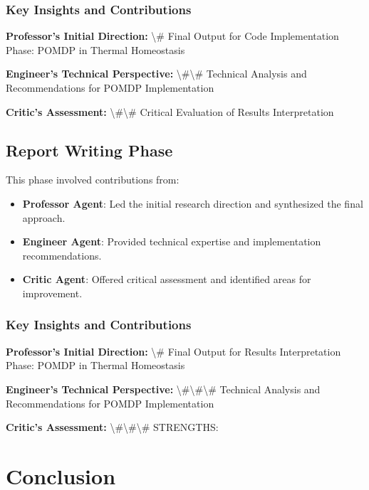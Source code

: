 \documentclass[11pt,a4paper]{article}
\begin{document}
\subsubsection{Key Insights and Contributions}


\textbf{Professor's Initial Direction:} \textbackslash{}# Final Output for Code Implementation Phase: POMDP in Thermal Homeostasis


\textbf{Engineer's Technical Perspective:} \textbackslash{}#\textbackslash{}# Technical Analysis and Recommendations for POMDP Implementation


\textbf{Critic's Assessment:} \textbackslash{}#\textbackslash{}# Critical Evaluation of Results Interpretation


\subsection{Report Writing Phase}


This phase involved contributions from:

\begin{itemize}
\item \textbf{Professor Agent}: Led the initial research direction and synthesized the final approach.
\item \textbf{Engineer Agent}: Provided technical expertise and implementation recommendations.
\item \textbf{Critic Agent}: Offered critical assessment and identified areas for improvement.
\end{itemize}

\subsubsection{Key Insights and Contributions}


\textbf{Professor's Initial Direction:} \textbackslash{}# Final Output for Results Interpretation Phase: POMDP in Thermal Homeostasis


\textbf{Engineer's Technical Perspective:} \textbackslash{}#\textbackslash{}#\textbackslash{}# Technical Analysis and Recommendations for POMDP Implementation


\textbf{Critic's Assessment:} \textbackslash{}#\textbackslash{}#\textbackslash{}# STRENGTHS:


\section{Conclusion}
\end{document}
